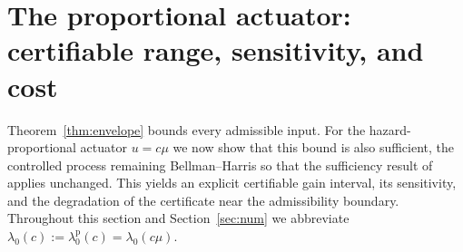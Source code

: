 \documentclass[letterpaper, 10pt, conference]{ieeeconf}
\newcommand{\rev}[1]{#1}
\begin{document}



\section{\rev{The proportional actuator: certifiable range, sensitivity, and cost}}
\label{sec:prop}
Theorem~\ref{thm:envelope} bounds every admissible input. \rev{For the
hazard-proportional actuator $u=c\mu$ we now show that this bound is also
sufficient, the controlled process remaining Bellman--Harris so that the
sufficiency result of~\cite{companion} applies unchanged. This yields an
explicit certifiable gain interval, its sensitivity, and the degradation of the
certificate near the admissibility boundary.} \rev{Throughout this section and
Section~\ref{sec:num} we abbreviate
$\lambda_0(c):=\lambda_0^{\mathrm p}(c)=\lambda_0(c\mu)$.}
\end{document}
